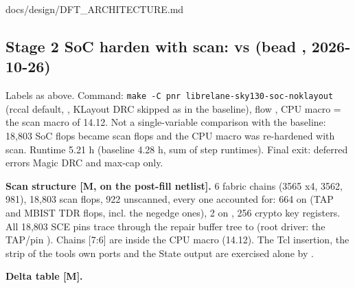 \begin{relocated}{docs/design/DFT_ARCHITECTURE.md}
\subsection{\texorpdfstring{Stage 2 SoC harden with scan:
 vs  (bead
,
2026-10-26)}{Stage 2 SoC harden with scan:  vs  (bead , 2026-10-26)}}\label{tm:ch:dft-architecture:1413-stage-2-soc-harden-with-scan-run-2026-10-26-09-59-03-vs-run-2026-10-25-08-28-45-bead-j41m8-2026-10-26}

Labels as above. Command:
\texttt{make\ -\allowbreak{}C\ pnr\ librelane-\allowbreak{}sky130-\allowbreak{}soc-\allowbreak{}noklayout}
(rccal default, , KLayout DRC skipped as in
the baseline), flow , CPU macro = the scan macro of
14.12. Not a single-variable comparison with the baseline: 18,803 SoC
flops became scan flops and the CPU macro was re-hardened with scan.
Runtime 5.21 h (baseline 4.28 h, sum of step runtimes). Final exit:
deferred errors Magic DRC and max-cap only.

\textbf{Scan structure {[}M,  on the
post-fill netlist{]}.} 6 fabric chains (3565 x4, 3562, 981), 18,803 scan
flops, 922 unscanned, every one accounted for: 664 on  (TAP
and MBIST TDR flops, incl. the negedge ones), 2 on ,
256 crypto key registers. All 18,803 SCE pins trace through the repair
buffer tree to  (root driver: the TAP/pin
). Chains {[}7:6{]} are inside the CPU macro (14.12). The
Tcl insertion, the strip of the tool\textquotesingle s own ports and the
State output are exercised alone by
.

\textbf{Delta table {[}M{]}.}

{\small\setlength{\tabcolsep}{4pt}

}
\end{relocated}
